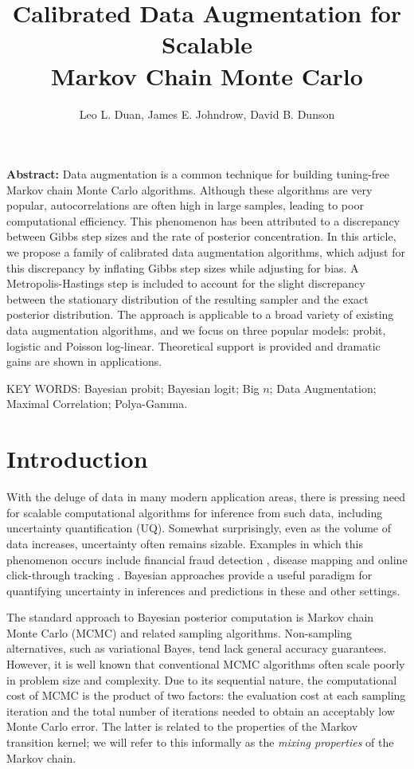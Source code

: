 \documentclass[10pt]{article}
\title
{{Calibrated Data Augmentation for Scalable \\ Markov Chain Monte Carlo}}
\author{
     Leo L. Duan,
     James E. Johndrow,
     David B. Dunson
}
\begin{document}
    
\maketitle

{\bf Abstract:} Data augmentation is a common technique for building tuning-free Markov chain Monte Carlo algorithms. Although these algorithms are very popular, 
autocorrelations are often high in large samples, leading to poor computational efficiency.  This phenomenon has been attributed to a discrepancy between Gibbs step sizes and the rate of posterior concentration.  In this article, we propose a family of calibrated data augmentation algorithms, which adjust for this discrepancy by inflating Gibbs step sizes  while adjusting for bias.  A Metropolis-Hastings step is included to account for the slight discrepancy between the stationary distribution of the resulting sampler and the exact posterior distribution.  The approach is applicable to a broad variety of existing data augmentation algorithms, and we focus on three popular models: probit, logistic and Poisson log-linear.  Theoretical support is provided and dramatic gains are shown in applications.
\vskip 12pt

{\noindent  KEY WORDS:  Bayesian probit; Bayesian logit; Big $n$; Data Augmentation; Maximal Correlation; Polya-Gamma.}
{}

\section{Introduction}

With the deluge of data in many modern application areas, there is pressing need for scalable computational algorithms for inference from such data, including uncertainty quantification (UQ).  Somewhat surprisingly, even as the volume of data increases, uncertainty often remains sizable.  Examples in which this phenomenon occurs include financial fraud detection \citep{ngai2011application}, disease mapping \citep{wakefield2007disease} and online click-through tracking \citep{wang2010click}.  Bayesian approaches provide a useful paradigm for quantifying uncertainty in inferences and predictions in these and other settings.

The standard approach to Bayesian posterior computation is Markov chain Monte Carlo (MCMC) and related sampling algorithms. Non-sampling alternatives, such as variational Bayes, tend lack general accuracy guarantees. However, it is well known that conventional MCMC algorithms often scale poorly in problem size and complexity. Due to its sequential nature, the computational cost of MCMC is the product of two factors: the evaluation cost at each sampling iteration and the total number of iterations needed to obtain an acceptably low Monte Carlo error. The latter is related to the properties of the Markov transition kernel; we will refer to this informally as the \emph{mixing properties} of the Markov chain. 
\end{document}
